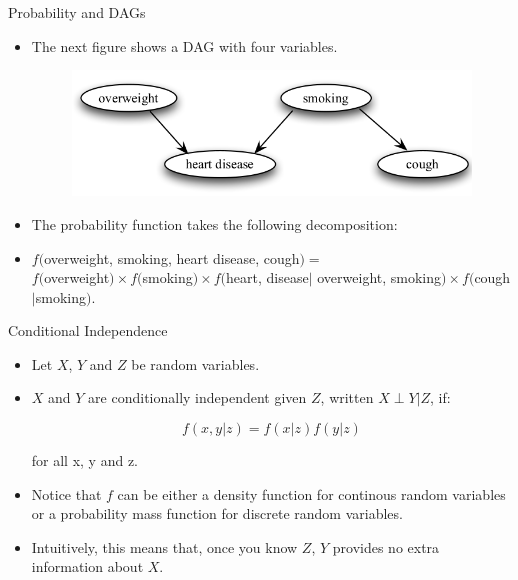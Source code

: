 \documentclass[handout]{beamer}
\begin{document}
\begin{frame}{Probability and DAGs}
\scriptsize{
\begin{itemize}


\item The next figure shows a DAG with four variables.

\begin{figure}[h!]
	\centering
	\includegraphics[scale=0.4]{pics/dag3.png}
	\end{figure} 



\item The probability function takes the following decomposition:

\item $f($overweight, smoking, heart disease, cough$) =$ \\    $f($overweight$) \times f($smoking$) \times f($heart, disease$|$ overweight, smoking$) \times f($cough$|$smoking$)$. 


\end{itemize}



} 

\end{frame}





\begin{frame}{Conditional Independence}
\scriptsize{
\begin{itemize}
\item Let $X$, $Y$ and $Z$ be random variables. 

\item $X$ and $Y$ are conditionally independent given $Z$, written $X \perp Y | Z$, if:

\begin{displaymath}
f(x, y|z) = f(x|z)f(y|z) 
\end{displaymath}


for all x, y and z.

\item Notice that $f$ can be either a density function for continous random variables or a probability mass function for discrete random variables.
 
\item Intuitively, this means that, once you know $Z$, $Y$ provides no extra information about $X$. 
 
\end{itemize}



} 

\end{frame}
\end{document}
